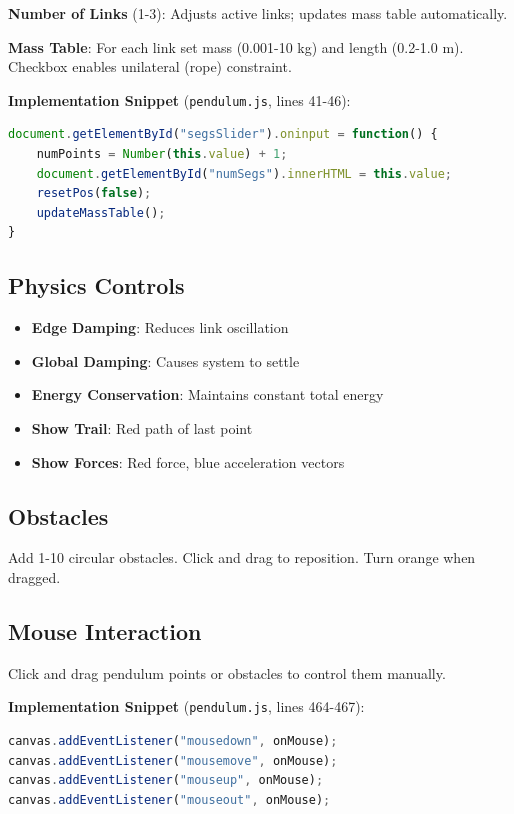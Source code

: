 \documentclass[12pt,a4paper]{article}
\begin{document}
\textbf{Number of Links} (1-3): Adjusts active links; updates mass table automatically.

\textbf{Mass Table}: For each link set mass (0.001-10 kg) and length (0.2-1.0 m). Checkbox enables unilateral (rope) constraint.

\noindent\textbf{Implementation Snippet} (\texttt{pendulum.js}, lines 41-46):
\begin{lstlisting}[language=JavaScript]
document.getElementById("segsSlider").oninput = function() {
    numPoints = Number(this.value) + 1;
    document.getElementById("numSegs").innerHTML = this.value;
    resetPos(false);
    updateMassTable();
}
\end{lstlisting}

\subsection{Physics Controls}

\begin{itemize}
\item \textbf{Edge Damping}: Reduces link oscillation
\item \textbf{Global Damping}: Causes system to settle
\item \textbf{Energy Conservation}: Maintains constant total energy
\item \textbf{Show Trail}: Red path of last point
\item \textbf{Show Forces}: Red force, blue acceleration vectors
\end{itemize}

\subsection{Obstacles}

Add 1-10 circular obstacles. Click and drag to reposition. Turn orange when dragged.

\subsection{Mouse Interaction}

Click and drag pendulum points or obstacles to control them manually.

\noindent\textbf{Implementation Snippet} (\texttt{pendulum.js}, lines 464-467):
\begin{lstlisting}[language=JavaScript]
canvas.addEventListener("mousedown", onMouse);
canvas.addEventListener("mousemove", onMouse);
canvas.addEventListener("mouseup", onMouse);
canvas.addEventListener("mouseout", onMouse);
\end{lstlisting}
\end{document}
